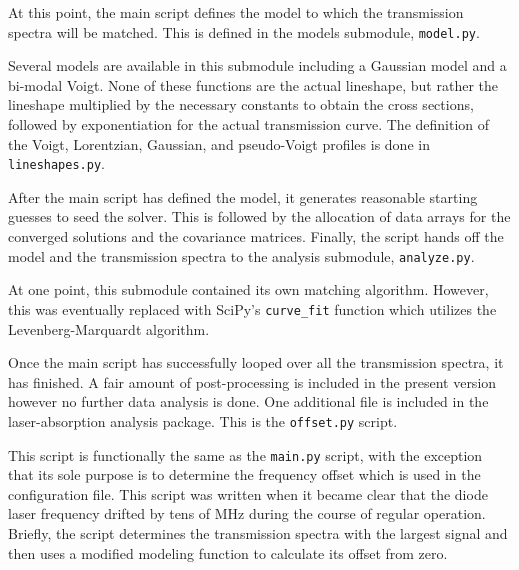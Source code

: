At this point, the main script defines the model to which the transmission
spectra will be matched. This is defined in the models submodule,
\texttt{model.py}.
\begin{singlespace}
  
\end{singlespace}
Several models are available in this submodule including a Gaussian model and a
bi-modal Voigt. None of these functions are the actual lineshape, but rather the
lineshape multiplied by the necessary constants to obtain the cross sections,
followed by exponentiation for the actual transmission curve. The definition of
the Voigt, Lorentzian, Gaussian, and pseudo-Voigt profiles is done in
\texttt{lineshapes.py}.
\begin{singlespace}
  
\end{singlespace}

After the main script has defined the model, it generates reasonable starting
guesses to seed the solver. This is followed by the allocation of data arrays
for the converged solutions and the covariance matrices. Finally, the script
hands off the model and the transmission spectra to the analysis submodule,
\texttt{analyze.py}.
\begin{singlespace}
  
\end{singlespace}
At one point, this submodule contained its own matching algorithm. However, this
was eventually replaced with SciPy's \texttt{curve\_fit} function which utilizes
the Levenberg-Marquardt algorithm.

Once the main script has successfully looped over all the transmission spectra,
it has finished. A fair amount of post-processing is included in the present
version however no further data analysis is done. One additional file is
included in the laser-absorption analysis package. This is the
\texttt{offset.py} script.
\begin{singlespace}
  
\end{singlespace}
This script is functionally the same as the \texttt{main.py} script, with the
exception that its sole purpose is to determine the frequency offset which is
used in the configuration file. This script was written when it became clear
that the diode laser frequency drifted by tens of MHz during the course of
regular operation. Briefly, the script determines the transmission spectra with
the largest signal and then uses a modified modeling function to calculate its
offset from zero.

